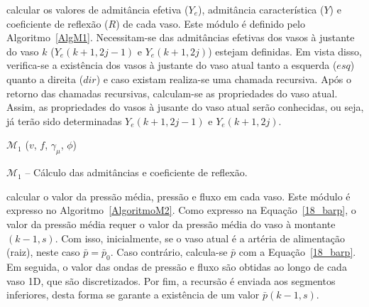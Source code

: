  calcular os valores de admitância efetiva ($Y_e$), admitância característica ($Y$) e coeficiente de reflexão ($R$) de cada vaso. Este módulo é definido pelo Algoritmo~\ref{AlgM1}. Necessitam-se das admitâncias efetivas dos vasos à justante do vaso $k$ ($Y_e(k+1,2j-1)$ e $Y_e(k+1,2j)$) estejam definidas. Em vista disso, verifica-se a existência dos vasos à justante do vaso atual tanto a esquerda ($esq$) quanto a direita ($dir$) e caso existam realiza-se uma chamada recursiva. Após o retorno das chamadas recursivas, calculam-se as propriedades do vaso atual. Assim, as propriedades do vasos à jusante do vaso atual serão conhecidas, ou seja, já terão sido determinadas $Y_e(k+1,2j-1)$ e $Y_e(k+1,2j)$.
\newpage

\begin{algorithm}[H]
	$\mathcal{M}_1$ ($v$, $f$, $\gamma_{\mu}$, $\phi$) \\
	\caption{$\mathcal{M}_1$ -- Cálculo das admitâncias e coeficiente de reflexão.}
	\label{AlgM1}
\end{algorithm}

 calcular o valor da pressão média, pressão e fluxo em cada vaso. Este módulo é expresso no Algoritmo~\ref{AlgoritmoM2}. Como expresso na Equação~\eqref{18_barp}, o valor da pressão média requer o valor da pressão média do vaso à montante $(k-1,s)$. Com isso, inicialmente, se o vaso atual é a artéria de alimentação (raiz), neste caso $\bar{p} = \bar{p}_0$. Caso contrário, calcula-se $\bar{p}$ com a Equação~\eqref{18_barp}. Em seguida, o valor das ondas de pressão e fluxo são obtidas ao longo de cada vaso 1D, que são discretizados. Por fim, a recursão é enviada aos segmentos inferiores, desta forma se garante a existência de um valor $\bar{p}(k-1,s)$.

